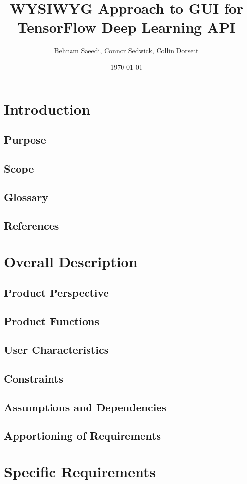 \documentclass[a4paper,10pt]{article} \usepackage[margin=1.0in]{geometry} \usepackage{pdfpages} \usepackage{graphicx}
\title{WYSIWYG Approach to GUI for TensorFlow Deep Learning API}
\author{Behnam Saeedi, Connor Sedwick, Collin Dorsett}
\date{\today}
\begin{document}
\maketitle
\newpage
\tableofcontents
\newpage
\section{Introduction}
\subsection{Purpose}
\subsection{Scope}
\subsection{Glossary}
\subsection{References}
\newpage

\section{Overall Description}
\subsection{Product Perspective}
\subsection{Product Functions}
\subsection{User Characteristics}
\subsection{Constraints}
\subsection{Assumptions and Dependencies}
\subsection{Apportioning of Requirements}
\newpage

\section{Specific Requirements}
\end{document}

